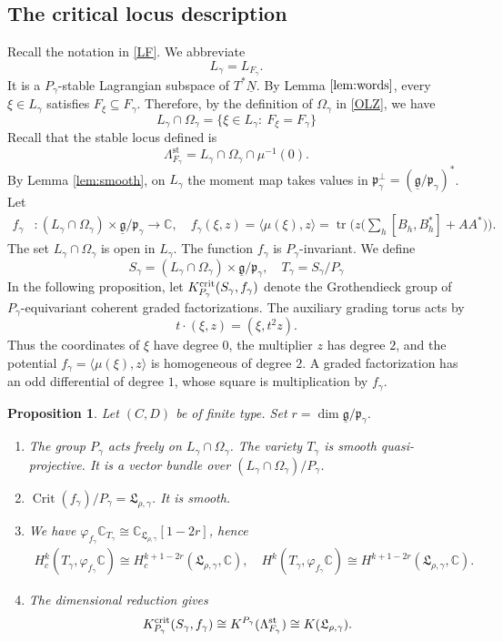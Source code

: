 \documentclass[11pt,reqno]{amsart}
\newtheorem{Proposition}[Theorem]{Proposition}
\theoremstyle{definition}
\theoremstyle{remark}
\def\bbC{\mathbb C}
\def\dN{\underline N}
\def\dg{\underline{\mathfrak g}}
\def\frakp{\mathfrak p}
\begin{document}
\subsection{The critical locus description}\label{subsec:ns-crit}
Recall the notation in \eqref{LF}. We abbreviate
$$L_\gamma=L_{F_\gamma}.$$
It is a $P_\gamma$-stable Lagrangian subspace of $T^*\dN$. 
By Lemma \(\ref{lem:words}\), every \(\xi\in L_\gamma\) satisfies \(F_\xi\subseteq F_\gamma\). 
Therefore, by the definition of \(\Omega_\gamma\) in \eqref{OLZ}, we have
\[
L_\gamma\cap\Omega_\gamma=\{\xi\in L_\gamma:\ F_\xi=F_\gamma\}
\]
Recall that the stable locus defined is
\[\Lambda_{F_\gamma}^{\mathrm{st}}=L_\gamma\cap\Omega_\gamma\cap\mu^{-1}(0).\]
By Lemma \ref{lem:smooth}, on $L_\gamma$ the moment map takes values in 
$\frakp_\gamma^\perp=(\dg/\frakp_\gamma)^*$.
Let
\begin{align*}
f_\gamma&:(L_\gamma\cap\Omega_\gamma)\times\dg/\frakp_\gamma\to\bbC,\quad
f_\gamma(\xi,z)=\langle\mu(\xi),z\rangle=\operatorname{tr}\Big(z\big(\textstyle\sum_h[B_h,B_h^*]+AA^*\big)\Big).
\end{align*}
The set $L_\gamma\cap\Omega_\gamma$ is open in $L_\gamma$.
The function $f_\gamma$ is $P_\gamma$-invariant.
We define
$$S_\gamma=(L_\gamma\cap\Omega_\gamma)\times\dg/\frakp_\gamma,\quad T_\gamma=S_\gamma/P_\gamma$$
In the following proposition, let \(K^{\rm crit}_{P_\gamma}(S_\gamma,f_\gamma)\) denote the Grothendieck group of 
\(P_\gamma\)-equivariant coherent graded factorizations. The auxiliary grading torus acts by 
$$t\cdot(\xi,z)=(\xi,t^2z).$$ 
Thus the coordinates of \(\xi\) have degree \(0\), the multiplier \(z\) has degree \(2\), and the potential \(f_\gamma=\langle\mu(\xi),z\rangle\) 
is homogeneous of degree \(2\). A graded factorization has an odd differential of degree \(1\), whose square is multiplication by 
\(f_\gamma\).


\begin{Proposition}\label{prop:ns-crit}
Let $(C,D)$ be of finite type. Set $r=\dim\dg/\frakp_\gamma$. 
\begin{enumerate}[label=$\mathrm{(\alph*)}$,leftmargin=8mm]
\item The group $P_\gamma$ acts freely on $L_\gamma\cap\Omega_\gamma$.
The variety $T_\gamma$ is smooth quasi-projective.
It is a vector bundle over $(L_\gamma\cap\Omega_\gamma)/P_\gamma$.
\item 
 $\operatorname{Crit}(f_\gamma)/P_\gamma=\mathfrak L_{\rho,\gamma}$. It is smooth.
\item 
We have $\varphi_{f_\gamma}\bbC_{T_\gamma}\cong\bbC_{\mathfrak L_{\rho,\gamma}}[1-2r]$, hence
\begin{align*}
 H_c^k(T_\gamma,\varphi_{f_\gamma}\bbC)\cong H_c^{k+1-2r}({\mathfrak L_{\rho,\gamma}},\bbC),\quad
 H^k(T_\gamma,\varphi_{f_\gamma}\bbC)\cong H^{k+1-2r}({\mathfrak L_{\rho,\gamma}},\bbC).
\end{align*}
\item
The dimensional reduction gives
\[
 K^{\rm crit}_{P_\gamma}(S_\gamma,f_\gamma)
\cong K^{P_\gamma}(\Lambda^{\rm st}_{F_\gamma})\cong K(\mathfrak L_{\rho,\gamma}).
\]
\end{enumerate}
\end{Proposition}
\end{document}
